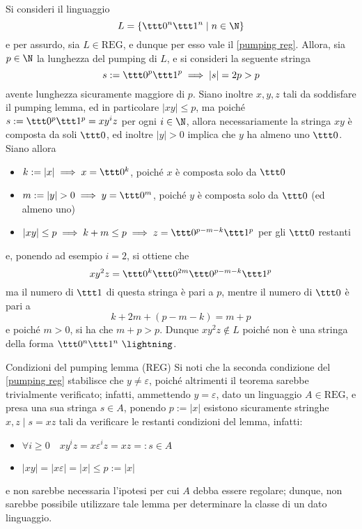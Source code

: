 \documentclass[a4paper, 12pt]{report}
\begin{document}
    \begin{example}
        \label{non reg ex}
        Si consideri il linguaggio $$L = \{\ttt 0 ^n \ttt 1 ^n \mid n \in \N\}$$ e per assurdo, sia $L \in \mathrm{REG}$, e dunque per esso vale il \cref{pumping reg}. Allora, sia $p \in \N$ la lunghezza del pumping di $L$, e si consideri la seguente stringa $$s := \ttt 0 ^p \ttt 1^p \implies |s| = 2p > p$$ avente lunghezza sicuramente maggiore di $p$. Siano inoltre $x, y, z$ tali da soddisfare il pumping lemma, ed in particolare $|xy| \le p$, ma poiché $s := \ttt 0^p \ttt 1^p = xy^iz$ per ogni $i \in \N$, allora necessariamente la stringa $xy$ è composta da soli $\ttt 0$, ed inoltre $|y| > 0$ implica che $y$ ha almeno uno $\ttt 0$. Siano allora

        \begin{itemize}
            \item $k := |x| \implies x = \ttt 0^k$, poiché $x$ è composta solo da $\ttt 0$
            \item $m := |y| > 0 \implies y = \ttt 0^m$, poiché $y$ è composta solo da $\ttt 0$ (ed almeno uno)
            \item $|xy| \le p \implies k + m \le p \implies z = \ttt 0^{p-m-k} \ttt 1^p$ per gli $\ttt 0$ restanti
        \end{itemize}

        e, ponendo ad esempio $i = 2$, si ottiene che $$xy^2z = \ttt 0^k \ttt 0^{2m} \ttt 0^{p-m-k} \ttt 1^p$$ ma il numero di $\ttt 1$ di questa stringa è pari a $p$, mentre il numero di $\ttt 0$ è pari a $$k + 2m + (p - m - k) = m + p$$ e poiché $m > 0$, si ha che $m + p > p$. Dunque $xy^2z \notin L$ poiché non è una stringa della forma $\ttt 0 ^n \ttt 1^n \ \lightning$.
    \end{example}

    \begin{framedobs}{Condizioni del pumping lemma (REG)}
        Si noti che la seconda condizione del \cref{pumping reg} stabilisce che $y \neq \varepsilon$, poiché altrimenti il teorema sarebbe trivialmente verificato; infatti, ammettendo $y = \varepsilon$, dato un linguaggio $A \in \mathrm{REG}$, e presa una sua stringa $s \in A$, ponendo $p := |x|$ esistono sicuramente stringhe $x, z \mid s = xz$ tali da verificare le restanti condizioni del lemma, infatti:

        \begin{itemize}
            \item $\forall i \ge 0 \quad xy^iz = x \varepsilon^iz  = xz =: s \in A$
            \item $|xy| = |x \varepsilon| = |x| \le p := |x|$
        \end{itemize}

        e non sarebbe necessaria l'ipotesi per cui $A$ debba essere regolare; dunque, non sarebbe possibile utilizzare tale lemma per determinare la classe di un dato linguaggio.
    \end{framedobs}
\end{document}
